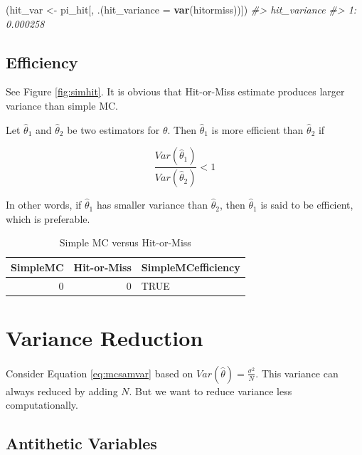 \documentclass[]{book}
\newenvironment{Shaded}{\begin{snugshade}}{\end{snugshade}}
\newcommand{\CommentTok}[1]{\textcolor[rgb]{0.56,0.35,0.01}{\textit{#1}}}
\newcommand{\DataTypeTok}[1]{\textcolor[rgb]{0.13,0.29,0.53}{#1}}
\newcommand{\KeywordTok}[1]{\textcolor[rgb]{0.13,0.29,0.53}{\textbf{#1}}}
\newcommand{\NormalTok}[1]{#1}
\newcommand{\StringTok}[1]{\textcolor[rgb]{0.31,0.60,0.02}{#1}}
\theoremstyle{definition}
\theoremstyle{definition}
\theoremstyle{definition}
\theoremstyle{remark}
\let\BeginKnitrBlock\begin \let\EndKnitrBlock\end
\begin{document}
\begin{Shaded}
\begin{Highlighting}[]
\NormalTok{(hit_var <-}
\StringTok{  }\NormalTok{pi_hit[,}
\NormalTok{         .(}\DataTypeTok{hit_variance =} \KeywordTok{var}\NormalTok{(hitormiss))])}
\CommentTok{#>    hit_variance}
\CommentTok{#> 1:     0.000258}
\end{Highlighting}
\end{Shaded}

\hypertarget{efficiency-1}{%
\subsection{Efficiency}\label{efficiency-1}}

See Figure \ref{fig:simhit}. It is obvious that Hit-or-Miss estimate produces larger variance than simple MC.

\BeginKnitrBlock{definition}[Efficiency]
\protect\hypertarget{def:eff}{}{\label{def:eff} {} }Let \(\hat\theta_1\) and \(\hat\theta_2\) be two estimators for \(\theta\). Then \(\hat\theta_1\) is more efficient than \(\hat\theta_2\) if

\[\frac{Var(\hat\theta_1)}{Var(\hat\theta_2)} < 1\]
\EndKnitrBlock{definition}

In other words, if \(\hat\theta_1\) has smaller variance than \(\hat\theta_2\), then \(\hat\theta_1\) is said to be efficient, which is preferable.

\begin{longtable}{r|r|l}
\caption{\label{tab:unnamed-chunk-49}Simple MC versus Hit-or-Miss}\\
\hline
SimpleMC & Hit-or-Miss & SimpleMCefficiency\\
\hline
0 & 0 & TRUE\\
\hline
\end{longtable}

\hypertarget{variance-reduction}{%
\section{Variance Reduction}\label{variance-reduction}}

Consider Equation \eqref{eq:mcsamvar} based on \(Var(\hat\theta) = \frac{\sigma^2}{N}\). This variance can always reduced by adding \(N\). But we want to reduce variance less computationally.

\hypertarget{antithetic-variables}{%
\subsection{Antithetic Variables}\label{antithetic-variables}}
\end{document}
